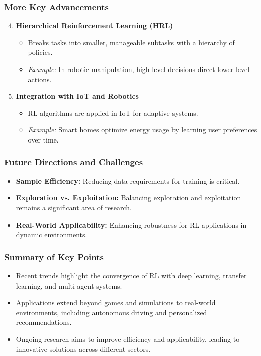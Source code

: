 \documentclass{beamer}
\begin{document}
\begin{frame}[fragile]
    \frametitle{More Key Advancements}
    \begin{enumerate}
        \setcounter{enumi}{3}
        \item \textbf{Hierarchical Reinforcement Learning (HRL)}
        \begin{itemize}
            \item Breaks tasks into smaller, manageable subtasks with a hierarchy of policies.
            \item \textit{Example:} In robotic manipulation, high-level decisions direct lower-level actions.
        \end{itemize}
        
        \item \textbf{Integration with IoT and Robotics}
        \begin{itemize}
            \item RL algorithms are applied in IoT for adaptive systems.
            \item \textit{Example:} Smart homes optimize energy usage by learning user preferences over time.
        \end{itemize}
    \end{enumerate}
\end{frame}

\begin{frame}[fragile]
    \frametitle{Future Directions and Challenges}
    \begin{itemize}
        \item \textbf{Sample Efficiency:} Reducing data requirements for training is critical.
        \item \textbf{Exploration vs. Exploitation:} Balancing exploration and exploitation remains a significant area of research.
        \item \textbf{Real-World Applicability:} Enhancing robustness for RL applications in dynamic environments.
    \end{itemize}
\end{frame}

\begin{frame}[fragile]
    \frametitle{Summary of Key Points}
    \begin{itemize}
        \item Recent trends highlight the convergence of RL with deep learning, transfer learning, and multi-agent systems.
        \item Applications extend beyond games and simulations to real-world environments, including autonomous driving and personalized recommendations.
        \item Ongoing research aims to improve efficiency and applicability, leading to innovative solutions across different sectors.
    \end{itemize}
\end{frame}
\end{document}
